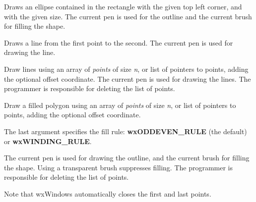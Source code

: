 Draws an ellipse contained in the rectangle with the given top left
corner, and with the given size.  The current pen is used for the
outline and the current brush for filling the shape.



Draws a line from the first point to the second. The current pen is
used for drawing the line.




Draw lines using an array of {\it points} of size {\it n}, or list of
pointers to points, adding the optional offset coordinate. The current
pen is used for drawing the lines.  The programmer is responsible for
deleting the list of points.




Draw a filled polygon using an array of {\it points} of size {\it n},
or list of pointers to points, adding the optional offset coordinate.

The last argument specifies the fill rule: {\bf wxODDEVEN\_RULE} (the
default) or {\bf wxWINDING\_RULE}.

The current pen is used for drawing the outline, and the current brush
for filling the shape.  Using a transparent brush suppresses filling.
The programmer is responsible for deleting the list of points.

Note that wxWindows automatically closes the first and last points.



